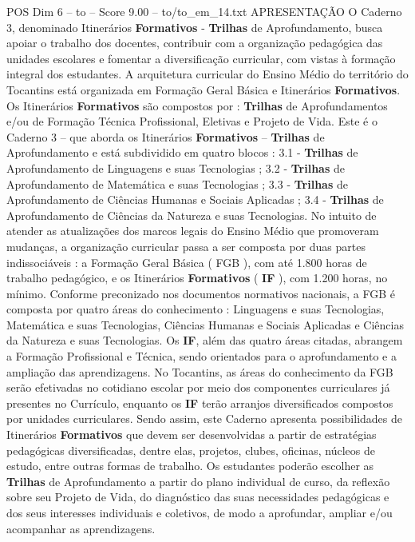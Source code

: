 \begin{textsample}{POS Dim 6 – to – Score 9.00 – to/to\_em\_14.txt}  \label{ex:f6_pos_174}
APRESENTAÇÃO O Caderno 3, denominado Itinerários \textbf{Formativos} - \textbf{Trilhas} de Aprofundamento, busca apoiar o trabalho dos docentes, contribuir com a organização pedagógica das unidades escolares e fomentar a diversificação curricular, com vistas à formação integral dos estudantes.
A arquitetura curricular do Ensino Médio do território do Tocantins está organizada em Formação Geral Básica e Itinerários \textbf{Formativos}.
Os Itinerários \textbf{Formativos} são compostos por : \textbf{Trilhas} de Aprofundamentos e/ou de Formação Técnica Profissional, Eletivas e Projeto de Vida.
Este é o Caderno 3 – que aborda os Itinerários \textbf{Formativos} – \textbf{Trilhas} de Aprofundamento e está subdividido em quatro blocos : 3.1 - \textbf{Trilhas} de Aprofundamento de Linguagens e suas Tecnologias ; 3.2 - \textbf{Trilhas} de Aprofundamento de Matemática e suas Tecnologias ; 3.3 - \textbf{Trilhas} de Aprofundamento de Ciências Humanas e Sociais Aplicadas ; 3.4 - \textbf{Trilhas} de Aprofundamento de Ciências da Natureza e suas Tecnologias.
No intuito de atender as atualizações dos marcos legais do Ensino Médio que promoveram mudanças, a organização curricular passa a ser composta por duas partes indissociáveis : a Formação Geral Básica ( FGB ), com até 1.800 horas de trabalho pedagógico, e os Itinerários \textbf{Formativos} ( \textbf{IF} ), com 1.200 horas, no mínimo.
Conforme preconizado nos documentos normativos nacionais, a FGB é composta por quatro áreas do conhecimento : Linguagens e suas Tecnologias, Matemática e suas Tecnologias, Ciências Humanas e Sociais Aplicadas e Ciências da Natureza e suas Tecnologias.
Os \textbf{IF}, além das quatro áreas citadas, abrangem a Formação Profissional e Técnica, sendo orientados para o aprofundamento e a ampliação das aprendizagens.
No Tocantins, as áreas do conhecimento da FGB serão efetivadas no cotidiano escolar por meio dos componentes curriculares já presentes no Currículo, enquanto os \textbf{IF} terão arranjos diversificados compostos por unidades curriculares.
Sendo assim, este Caderno apresenta possibilidades de Itinerários \textbf{Formativos} que devem ser desenvolvidas a partir de estratégias pedagógicas diversificadas, dentre elas, projetos, clubes, oficinas, núcleos de estudo, entre outras formas de trabalho.
Os estudantes poderão escolher as \textbf{Trilhas} de Aprofundamento a partir do plano individual de curso, da reflexão sobre seu Projeto de Vida, do diagnóstico das suas necessidades pedagógicas e dos seus interesses individuais e coletivos, de modo a aprofundar, ampliar e/ou acompanhar as aprendizagens.

\end{textsample}
